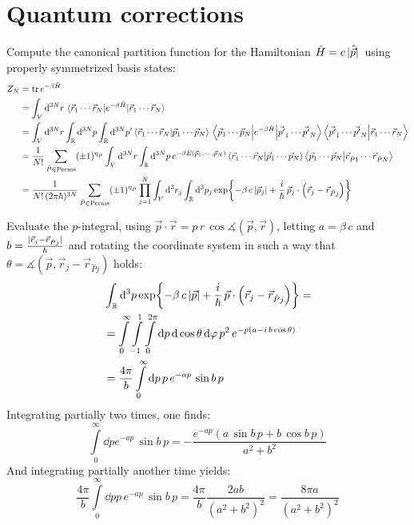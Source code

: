 \documentclass[11pt,a4paper]{scrartcl}
\begin{document}
\newpage

\section{Quantum corrections}

Compute the canonical partition function for the Hamiltonian
$\hat{H}=c\,\abs*{\hat{\vec{p}}}$ using properly symmetrized basis states:
\begin{align*}
    Z_N &= \tr e^{-\beta\hat{H}} \\
    &=
    \int_{V}\dd[3N]{r}\ev{e^{-\beta\hat{H}}}{\vec{r}_{1}\cdots\vec{r}_{N}} \\
    &= \int_{V}\dd[3N]{r}\int_{\mathbb{R}}\dd[3N]{p}\int_{\mathbb{R}}\dd[3N]{p'}
    \braket{\vec{r}_{1}\cdots\vec{r}_{N}}{\vec{p}_{1}\cdots\vec{p}_{N}}
    \mel{\vec{p}_{1}\cdots\vec{p}_{N}}{e^{-\beta\hat{H}}}{\vec{p'}_{1}\cdots\vec{p'}_{N}}
    \braket{\vec{p'}_{1}\cdots\vec{p'}_{N}}{\vec{r}_{1}\cdots\vec{r}_{N}} \\
    &= \frac{1}{N!}\sum_{\hat{P}\in\mathrm{Perms}}(\pm1)^{\eta_{\hat{P}}}
    \int_{V}\dd[3N]{r}\int_{\mathbb{R}}\dd[3N]{p}e^{-\beta
        E(\vec{p}_{1},\cdots,\vec{p}_{N})}
    \braket{\vec{r}_{1}\cdots\vec{r}_{N}}{\vec{p}_{1}\cdots\vec{p}_{N}}
    \braket{\vec{p}_{1}\cdots\vec{p}_{N}}{\vec{r}_{\hat{P}1}\cdots\vec{r}_{\hat{P}N}}
    \\
    &=
    \frac{1}{N!\,(2\pi\hbar)^{3N}}\sum_{\hat{P}\in\mathrm{Perms}}(\pm1)^{\eta_{\hat{P}}}
    \prod_{j=1}^{N}\int_{V}\dd[3]{r_j}\int_{\mathbb{R}}\dd[3]{p_j}
    \exp{-\beta\,c\,\abs{\vec{p}_j}
    +\frac{i}{\hbar}\,\vec{p}_{j}\cdot\left(\vec{r}_{j}-\vec{r}_{\hat{P}j}\right)}
\end{align*}

Evaluate the $p$-integral, using $\vec{p}\cdot\vec{r}=p\,r\,\cos\measuredangle(\vec{p},
\vec{r})$, letting $a=\beta\,c$ and
$b=\frac{\abs*{\vec{r}_{j}-\vec{r}_{\hat{P}j}}}{\hbar}$ and rotating the
coordinate system in such a way that $\theta=\measuredangle(\vec{p},
\vec{r}_{j}-\vec{r}_{\hat{P}j})$ holds:
\begin{align*}
    &\int_{\mathbb{R}}\dd[3]{p}\exp{-\beta\,c\,\abs{\vec{p}}+\frac{i}{\hbar}\,\vec{p}\cdot\left(\vec{r}_{j}-\vec{r}_{\hat{P}j}\right)}
    =\\&=
    \int\limits_{0}^{\infty}\int\limits_{-1}^{1}\int\limits_{0}^{2\pi}\dd{p}\dd{\cos\theta}\dd{\varphi}
    p^2\,e^{-p\left(a-i\,b\cos\theta\right)} \\
    &= \frac{4\pi}{b}\int\limits_{0}^{\infty}\dd{p}p\,e^{-ap}\,\sin b\,p %
\end{align*}
Integrating partially two times, one finds:
\begin{equation*}
    \int\limits_{0}^{\infty}\dd{p}e^{-ap}\,\sin b\,p
    =-\frac{e^{-ap}\left(a\,\sin b\,p+b\,\cos b\,p\right)}{a^2+b^2}
\end{equation*}
And integrating partially another time yields:
\begin{equation*}
    \frac{4\pi}{b}\int\limits_{0}^{\infty}\dd{p}p\,e^{-ap}\,\sin b\,p
    =\frac{4\pi}{b}\frac{2ab}{\left(a^2+b^2\right)^2}
    =\frac{8\pi a}{\left(a^2+b^2\right)^2}
\end{equation*}
\end{document}
